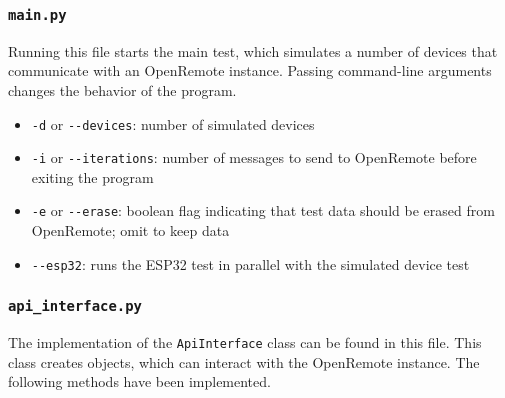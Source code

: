 \begin{appendices}
\subsubsection{\lstinline{main.py}} 
Running this file starts the main test, which simulates a number of devices that communicate with an OpenRemote instance. Passing command-line arguments changes the behavior of the program.
\begin{itemize}
\item  \lstinline{-d} or \lstinline{--devices}: number of simulated devices
\item  \lstinline{-i} or \lstinline{--iterations}: number of messages to send to OpenRemote before exiting the program
\item \lstinline{-e} or \lstinline{--erase}: boolean flag indicating that test data should be erased from OpenRemote; omit to keep data
\item \lstinline{--esp32}: runs the ESP32 test in parallel with the simulated device test
\end{itemize}

\subsubsection{\lstinline{api_interface.py}}
The implementation of the \lstinline{ApiInterface} class can be found in this file. This class creates objects, which can interact with the OpenRemote instance. The following methods have been implemented.
\begin{itemize}


\end{itemize}
\end{appendices}
